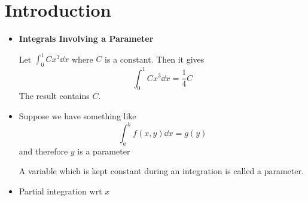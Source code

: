 \section{Introduction}
\begin{itemize}
    \item \textbf{Integrals Involving a Parameter}
          \begin{example}
              Let $\int_0^1 Cx^3 \dd{x}$ where $C$ is a constant. Then it gives
              \begin{equation}
                  \int_0^1 Cx^3 \dd{x} = \frac{1}{4}C
              \end{equation}
              The result contains $C$.
          \end{example}
    \item Suppose we have something like
          \begin{equation}
              \int_a^b f(x,y) \dd{x} = g(y)
          \end{equation}
          and therefore $y$ is a parameter
          \begin{definition}
              A variable which is kept constant during an integration is called a parameter.
          \end{definition}
    \item         Partial integration wrt $x$


\end{itemize}
